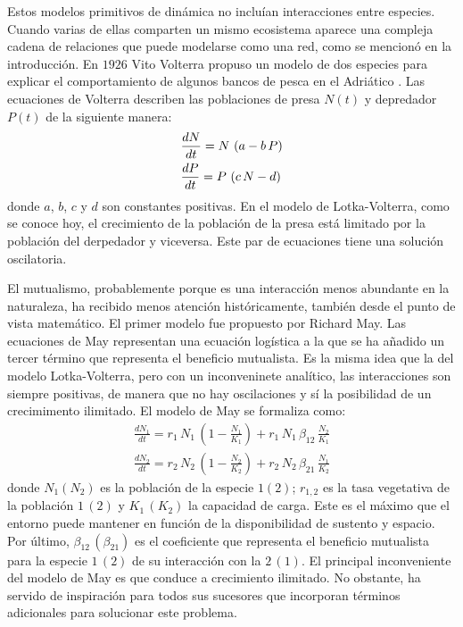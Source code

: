 Estos modelos primitivos de dinámica no incluían interacciones entre especies. Cuando varias de ellas comparten un mismo ecosistema aparece una compleja cadena de relaciones que puede modelarse como una red, como se mencionó en la introducción. En $1926$ Vito Volterra propuso un modelo de dos especies para explicar el comportamiento de algunos bancos de pesca en el Adriático \cite{volterra1926}. Las ecuaciones de Volterra describen las poblaciones de presa $N(t)$ y depredador $P(t)$ de la siguiente manera: 
\begin{align}
\displaystyle &\frac{dN}{dt}=N\, \left(a-b \,P\right) \nonumber\\
\displaystyle &\frac{dP}{dt}=P\, \left(c\, N-d\right) 
\label{myeq1}
\end{align}
\noindent donde $a$, $b$, $c$ y $d$ son constantes positivas. En el modelo de Lotka-Volterra, como se conoce hoy, el crecimiento de la población de la presa está limitado por la población del derpedador y viceversa. Este par de ecuaciones tiene una solución oscilatoria.

El mutualismo, probablemente porque es una interacción menos abundante en la naturaleza, ha recibido menos atención históricamente, también desde el punto de vista matemático. El primer modelo fue propuesto por Richard May. Las ecuaciones de May representan una ecuación logística a la que se ha añadido un tercer término que representa el beneficio mutualista. Es la misma idea que la del modelo Lotka-Volterra, pero con un inconveninete analítico, las interacciones son siempre positivas, de manera que no hay oscilaciones y sí la posibilidad de un crecimimento ilimitado. El modelo de May se formaliza como:
\begin{align}
\frac{dN_1}{dt}=r_1 \,N_1\,\left(1-\frac{N_1}{K_1}\right)+r_1\, N_1\,\beta_{12}\, \frac{N_2}{K_1} \nonumber \\ 
\frac{dN_2}{dt}=r_2\, N_2\, \left(1-\frac{N_2}{K_2}\right)+r_2\, N_2\, \beta_{21} \, \frac{N_1}{K_2} 
\label{myeq2}
\end{align}
\noindent donde $N_1(N_2)$ es la población de la especie $1(2)$; $r_{1,2}$ es la tasa vegetativa de la población $1\, (2)$ y $K_1\, (K_2)$ la capacidad de carga. Este es el máximo que el entorno puede mantener en función de la disponibilidad de sustento y espacio. Por último, $\beta_{12}\,(\beta_{21})$ es el coeficiente que representa el beneficio mutualista para la especie $1\,(2)$ de su interacción con la $2\,(1)$. El principal inconveniente del modelo de May es que conduce a crecimiento ilimitado. No obstante, ha servido de inspiración para todos sus sucesores que incorporan términos adicionales para solucionar este problema.

